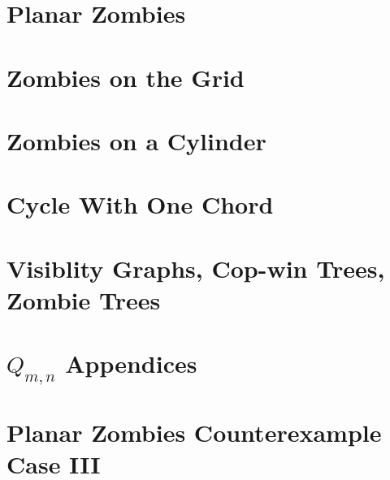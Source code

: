 \documentclass[letterpaper, 12pt]{report}
\theoremstyle{definition}
\begin{document}
\section{Planar Zombies}


\section{Zombies on the Grid}


\section{Zombies on a Cylinder}


\section{Cycle With One Chord}


\section{Visiblity Graphs, Cop-win Trees, Zombie Trees}
%

\newpage



\newpage
\appendix
\section{$Q_{m, n}$ Appendices}


\newpage
\section{Planar Zombies Counterexample Case III}

\end{document}
